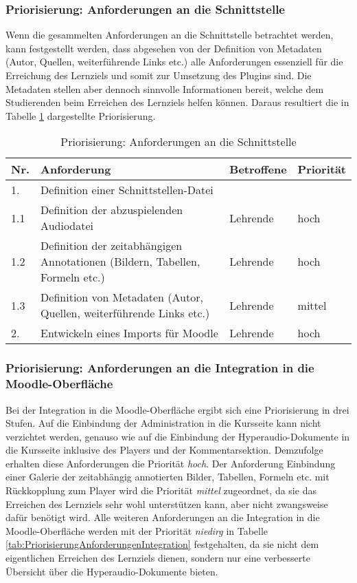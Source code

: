 \subsubsection{Priorisierung: Anforderungen an die Schnittstelle}
Wenn die gesammelten Anforderungen an die Schnittstelle betrachtet werden, kann festgestellt werden, dass abgesehen von der Definition von Metadaten (Autor, Quellen, weiterführende Links etc.) alle Anforderungen essenziell für die Erreichung des Lernziels und somit zur Umsetzung des Plugins sind. Die Metadaten stellen aber dennoch sinnvolle Informationen bereit, welche dem Studierenden beim Erreichen des Lernziels helfen können. Daraus resultiert die in Tabelle \ref{tab:PriorisierungAnforderungenSchnittstelle} dargestellte Priorisierung.

\begin{table}[!ht]
\def\arraystretch{1.4}
\caption{Priorisierung: Anforderungen an die Schnittstelle}
\label{tab:PriorisierungAnforderungenSchnittstelle}
 \begin{tabularx}{\textwidth}{lXll}      
    \hline
    Nr. & Anforderung & Betroffene & Priorität
    \\\hline
    1. & Definition einer Schnittstellen-Datei & & \\
    1.1 & Definition der abzuspielenden Audiodatei & Lehrende & hoch\\
    1.2 & Definition der zeitabhängigen Annotationen (Bildern, Tabellen, Formeln etc.) & Lehrende & hoch\\
    1.3 & Definition von Metadaten (Autor, Quellen, weiterführende Links etc.) & Lehrende & mittel\\
    2. & Entwickeln eines Imports für Moodle & Lehrende & hoch\\
    \hline
    \end{tabularx}
\end{table}

\subsubsection{Priorisierung: Anforderungen an die Integration in die Moodle-Oberfläche}
Bei der Integration in die Moodle-Oberfläche ergibt sich eine Priorisierung in drei Stufen. Auf die Einbindung der Administration in die Kursseite kann nicht verzichtet werden, genauso wie auf die Einbindung der Hyperaudio-Dokumente in die Kursseite inklusive des Players und der Kommentarsektion. Demzufolge erhalten diese Anforderungen die Priorität \textit{hoch}. Der Anforderung \glqq Einbindung einer Galerie der zeitabhängig annotierten Bilder, Tabellen, Formeln etc. mit Rückkopplung zum Player\grqq{} wird die Priorität \textit{mittel} zugeordnet, da sie das Erreichen des Lernziels sehr wohl unterstützen kann, aber nicht zwangsweise dafür benötigt wird. Alle weiteren Anforderungen an die Integration in die Moodle-Oberfläche werden mit der Priorität \textit{niedirg} in Tabelle \ref{tab:PriorisierungAnforderungenIntegration} festgehalten, da sie nicht dem eigentlichen Erreichen des Lernziels dienen, sondern nur eine verbesserte Übersicht über die Hyperaudio-Dokumente bieten.

